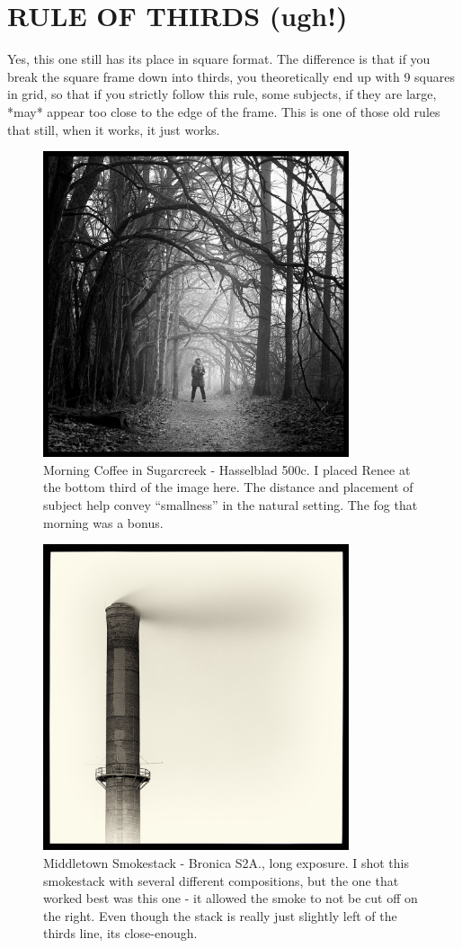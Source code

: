 \documentclass[a4paper]{article}
\begin{document}
\section*{RULE OF THIRDS (ugh!)}
Yes, this one still has its place in square format. The difference  is that if you break the square frame down into thirds, you theoretically end up with 9 squares in grid, so that if you strictly follow this rule, some subjects, if they are large, *may* appear too close to the edge of the frame. This is one of those old rules that still, when it works, it just works.   

\begin{figure}[ht!]
    \centering
    \includegraphics[width=90mm]{img/49286859422_ca0d380757_k.jpeg}
    \caption{Morning Coffee in Sugarcreek - Hasselblad 500c. I placed Renee at the bottom third of the image here. The distance and placement of subject help convey “smallness” in the natural setting. The fog that morning was a bonus.}
\end{figure}


\begin{figure}[ht!]
    \centering
    \includegraphics[width=90mm]{img/39124998042_470b8027ca_k.jpeg}
    \caption{Middletown Smokestack - Bronica S2A., long exposure. I shot this smokestack with several different compositions, but the one that worked best was this one - it allowed the smoke to not be cut off on the right. Even though the stack is really just slightly left of the thirds line, its close-enough.}
\end{figure}
\end{document}
